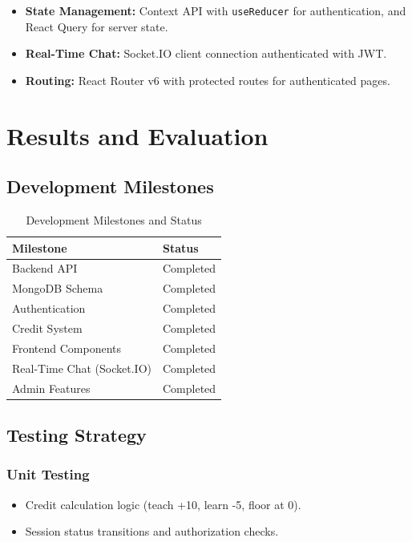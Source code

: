 \documentclass{tietreport}
\begin{document}
\begin{itemize}
  \item \textbf{State Management:} Context API with \texttt{useReducer} for authentication, and React Query for server state.
  \item \textbf{Real-Time Chat:} Socket.IO client connection authenticated with JWT.
  \item \textbf{Routing:} React Router v6 with protected routes for authenticated pages.
\end{itemize}


\chapter{Results and Evaluation}

\section{Development Milestones}

\begin{table}[h]
\centering
\begin{tabular}{|l|l|}
  \hline
  \textbf{Milestone} & \textbf{Status} \\
  \hline
  Backend API & Completed \\
  \hline
  MongoDB Schema & Completed \\
  \hline
  Authentication & Completed \\
  \hline
  Credit System & Completed \\
  \hline
  Frontend Components & Completed \\
  \hline
  Real-Time Chat (Socket.IO) & Completed \\
  \hline
  Admin Features & Completed \\
  \hline
\end{tabular}
\caption{Development Milestones and Status}
\label{tab:milestones}
\end{table}

\section{Testing Strategy}

\subsection{Unit Testing}

\begin{itemize}
  \item Credit calculation logic (teach +10, learn -5, floor at 0).
  \item Session status transitions and authorization checks.
\end{itemize}
\end{document}
